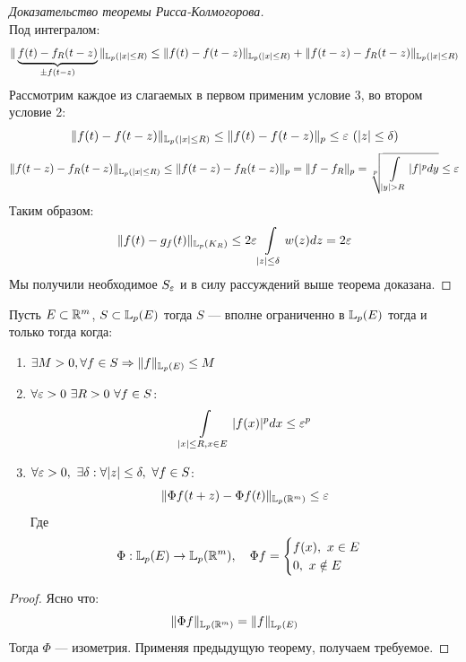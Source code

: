 \begin{proof}[Доказательство теоремы Рисса-Колмогорова]
$$	$$
	Под интегралом:
	$$
	\|\underbrace{f(t) - f_R(t -z)}_{\pm f(t-z)}\|_{\mathbb{L}_p(|x| \leq R)} \leq \|f(t)-f(t-z)\|_{\mathbb{L}_p(|x| \leq R)} + \|f(t-z) - f_R(t-z)\|_{\mathbb{L}_p(|x| \leq R)}
	$$
	Рассмотрим каждое из слагаемых в первом применим условие 3, во втором условие 2: 
	$$
	\|f(t)-f(t-z)\|_{\mathbb{L}_p(|x| \leq R)} \leq \|f(t)-f(t-z)\|_p \leq \varepsilon \ (|z| \leq \delta)
	$$
	$$
	\|f(t-z) - f_R(t-z)\|_{\mathbb{L}_p(|x| \leq R)} \leq \|f(t-z) - f_R(t-z)\|_p  = \|f - f_R\|_p = \sqrt[p]{\int\limits_{|y| > R} |f|^pdy} \leq \varepsilon 
	$$
	Таким образом:
	$$
	\|f(t) - g_f(t)\|_{\mathbb{L}_p(K_R)} \leq 2\varepsilon \int\limits_{|z|\leq \delta} w(z)dz  = 2\varepsilon
	$$
	Мы получили необходимое $S_\varepsilon$ и в силу рассуждений выше теорема доказана.
\end{proof}
\begin{next0}
	Пусть $E \subset \mathbb{R}^m$, $S \subset \mathbb{L}_p(E)$ тогда $S$ --- вполне ограниченно в $\mathbb{L}_p(E)$ тогда и только тогда когда:
	\begin{enumerate}
		\item $\exists M > 0, \forall f \in S \Rightarrow \|f\|_{\mathbb{L}_p(E)} \leq M$
		\item $\forall \varepsilon > 0 \ \exists R > 0 \ \forall f \in S$:
		$$
		\int\limits_{|x| \leq R, x \in E} |f(x)|^p dx \leq \varepsilon^p
		$$
		\item $\forall \varepsilon > 0, \ \exists \delta :  \forall |z| \leq \delta, \ \forall f \in S$: 
		$$
		\| \Phi f (t + z) - \Phi f(t)\|_{\mathbb{L}_p(\mathbb{R}^m)} \leq \varepsilon
		$$ 
		Где 
		$$
		\Phi : \mathbb{L}_p(E) \rightarrow \mathbb{L}_p(\mathbb{R}^m), \quad \Phi f = \begin{cases}
			f(x), \ x\in E \\
			0, \ x \notin E
		\end{cases}
		$$
	\end{enumerate}
\end{next0}
\begin{proof}
	Ясно что:
	$$
	\|\Phi f\|_{\mathbb{L}_p(\mathbb{R}^m)} = \|f\|_{\mathbb{L}_p(E)}
	$$
	Тогда $\Phi$ --- изометрия. Применяя предыдущую теорему, получаем требуемое. 
\end{proof}